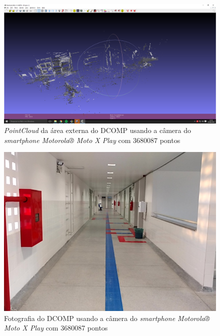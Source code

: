 \begin{figure}[H]
	\centering
		\includegraphics[width= \textwidth]{Imagens/dcompMotox.PNG}
	\caption{\textit{PointCloud} da área externa do DCOMP usando a câmera do \textit{smartphone Motorola® Moto X Play} com 3680087 pontos}
\end{figure}

\begin{figure}[H]
	\centering
		\includegraphics[width= \textwidth]{Imagens/scene00087.jpg}
	\caption{Fotografia do DCOMP usando a câmera do \textit{smartphone Motorola® Moto X Play} com 3680087 pontos}
\end{figure}


